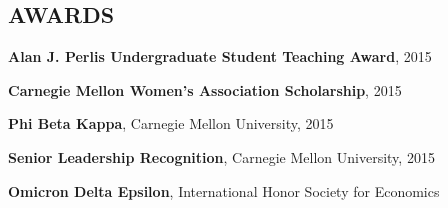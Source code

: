 \documentclass[margin, 11pt]{res} %
\begin{document}
\begin{resume}
\section{AWARDS}

{\bf Alan J. Perlis Undergraduate Student Teaching Award}, 2015

\vspace{4pt}

{\bf Carnegie Mellon Women's Association Scholarship}, 2015

\vspace{4pt}

{\bf Phi Beta Kappa}, Carnegie Mellon University, 2015

\vspace{4pt}

{\bf Senior Leadership Recognition}, Carnegie Mellon University, 2015

\vspace{4pt}



{\bf Omicron Delta Epsilon}, International Honor Society for Economics


\end{resume}
\end{document}
